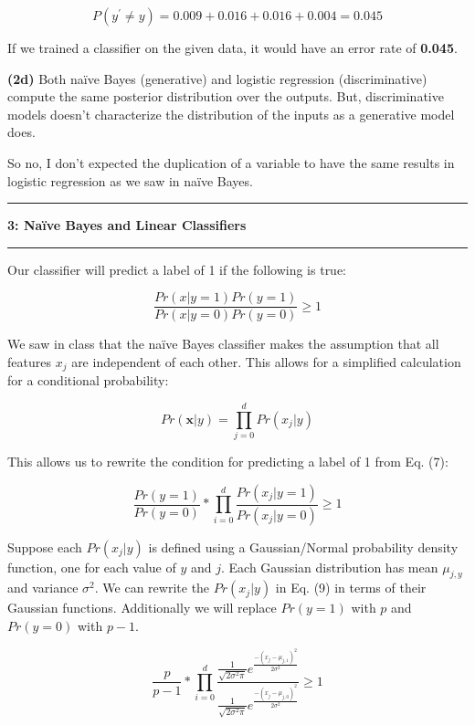\documentclass[11pt]{article}
\newcommand\question[2]{\vspace{.25in}\hrule\textbf{#1: #2}\vspace{.5em}\hrule\vspace{.10in}}
\renewcommand\part[1]{\vspace{.10in}\textbf{(#1)}}
\begin{document}
$$P(y^\prime \neq y) = 0.009 + 0.016 + 0.016 + 0.004 = 0.045$$

If we trained a classifier on the given data, it would have an error rate of \textbf{0.045}.

\part{2d} Both na\"ive Bayes (generative) and logistic regression (discriminative) compute the same posterior distribution over the outputs. But, discriminative models doesn't characterize the distribution of the inputs as a generative model does.

So no, I don't expected the duplication of a variable to have the same results in logistic regression as we saw in na\"ive Bayes.

\question{3}{Na\"{i}ve Bayes and Linear Classifiers} Our classifier will predict a label of 1 if the following is true:

\begin{equation}
\frac{Pr(x|y = 1)Pr(y=1)}{Pr(x|y = 0)Pr(y = 0)} \geq 1
\end{equation}

We saw in class that the na\"ive Bayes classifier makes the assumption that all features $x_j$ are independent of each other. This allows for a simplified calculation for a conditional probability:

\begin{equation}
Pr(\mathbf{x}|y) = \prod_{j=0}^d Pr(x_j|y)
\end{equation}

This allows us to rewrite the condition for predicting a label of 1 from Eq. (7):

\begin{equation}
\frac{Pr(y=1)}{Pr(y=0)} * \prod_{i = 0}^d \frac{Pr(x_j | y = 1)}{Pr(x_j | y = 0)} \geq 1
\end{equation}

Suppose each $Pr(x_j|y)$ is defined using a Gaussian/Normal probability density function, one for each value of $y$ and $j$. Each Gaussian distribution has mean $\mu_{j,y}$ and variance $\sigma^2$. We can rewrite the $Pr(x_j|y)$ in Eq. (9) in terms of their Gaussian functions. Additionally we will replace $Pr(y = 1)$ with $p$ and $Pr(y = 0)$ with $p - 1$.

\begin{equation}
\frac{p}{p-1} * \prod_{i = 0}^d \frac{\frac{1}{\sqrt{2\sigma^2\pi}}e^{\frac{-(x_j-\mu_{j,1})^2}{2\sigma^2}}}{\frac{1}{\sqrt{2\sigma^2\pi}}e^{\frac{-(x_j-\mu_{j,0})^2}{2\sigma^2}}} \geq 1
\end{equation}
\end{document}

